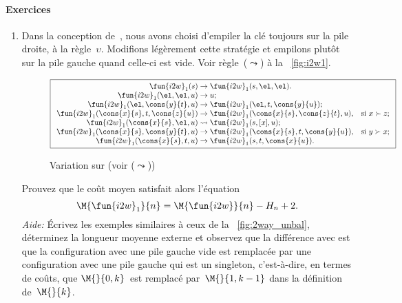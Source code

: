 \paragraph{Exercices}
\begin{enumerate}

  \item Dans la conception de~, nous
    avons choisi d'empiler la clé toujours sur la pile droite, à la
    règle~\(\upsilon\). Modifions légèrement cette stratégie et
    empilons plutôt sur la pile gauche quand celle-ci est vide. Voir
    règle~(\(\leadsto\)) à la \fig~\vref{fig:i2w1}.
    \begin{figure}[b]
    \begin{equation*}
      \boxed{%
      \begin{array}{r@{\;}l@{\;}ll}
        \fun{i2w}_1(s) & \rightarrow
                      & \fun{i2w}_1(s,\el,\el).\\
        \fun{i2w}_1(\el,\el,u) & \rightarrow & u;\\
        \fun{i2w}_1(\el,\cons{y}{t},u)
                     & \rightarrow
                     & \fun{i2w}_1(\el,t,\cons{y}{u});\\
        \fun{i2w}_1(\cons{x}{s},t,\cons{z}{u})
                     & \rightarrow
                     & \fun{i2w}_1(\cons{x}{s},\cons{z}{t},u),
                     & \text{si \(x \succ z\)};\\
        \fun{i2w}_1(\cons{x}{s},\el,u)
                     & \leadsto
                     & \fun{i2w}_1(s,[x],u);\\
        \fun{i2w}_1(\cons{x}{s},\cons{y}{t},u)
                     & \rightarrow
                     & \fun{i2w}_1(\cons{x}{s},t,\cons{y}{u}),
                     & \text{si \(y \succ x\)};\\
        \fun{i2w}_1(\cons{x}{s},t,u)
                     & \rightarrow
                     & \fun{i2w}_1(s,t,\cons{x}{u}).
      \end{array}}
    \end{equation*}
    \caption{Variation  sur  (voir
      (\(\leadsto\)))\label{fig:i2w1}}
    \end{figure}
    Prouvez que le coût moyen satisfait alors l'équation
     
    \begin{equation*}
      \M{\fun{i2w}_1}{n} = \M{\fun{i2w}}{n} - H_n + 2.
    \end{equation*}
    \emph{Aide:} Écrivez les exemples similaires à ceux de la
    \fig~\vref{fig:2way_unbal}, déterminez la longueur moyenne externe
    et observez que la différence avec
     est que la configuration avec
    une pile gauche vide est remplacée par une configuration avec une
    pile gauche qui est un singleton, c'est-à-dire, en termes de
    coûts, que \(\M{}{0,k}\)~est remplacé par~\(\M{}{1,k-1}\) dans la
    définition de~\(\M{}{k}\).


\end{enumerate}
